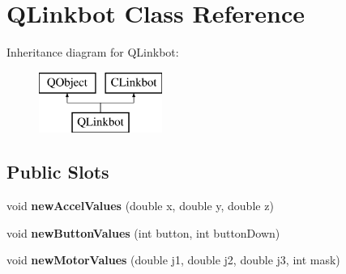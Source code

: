 \hypertarget{class_q_linkbot}{\section{Q\-Linkbot Class Reference}
\label{class_q_linkbot}
}
Inheritance diagram for Q\-Linkbot\-:\begin{figure}[H]
\begin{center}
\leavevmode
\includegraphics[height=2.000000cm]{class_q_linkbot}
\end{center}
\end{figure}
\subsection*{Public Slots}
\begin{DoxyCompactItemize}
\item 
\hypertarget{class_q_linkbot_a005462b48ca50175a9f27e7ea58c9acb}{void {\bfseries new\-Accel\-Values} (double x, double y, double z)}\label{class_q_linkbot_a005462b48ca50175a9f27e7ea58c9acb}

\item 
\hypertarget{class_q_linkbot_af6ccf5b180ecd88d43dad868d0f28e38}{void {\bfseries new\-Button\-Values} (int button, int button\-Down)}\label{class_q_linkbot_af6ccf5b180ecd88d43dad868d0f28e38}

\item 
\hypertarget{class_q_linkbot_a62cf029f23de74872433b69e42b5d094}{void {\bfseries new\-Motor\-Values} (double j1, double j2, double j3, int mask)}\label{class_q_linkbot_a62cf029f23de74872433b69e42b5d094}

\end{DoxyCompactItemize}

